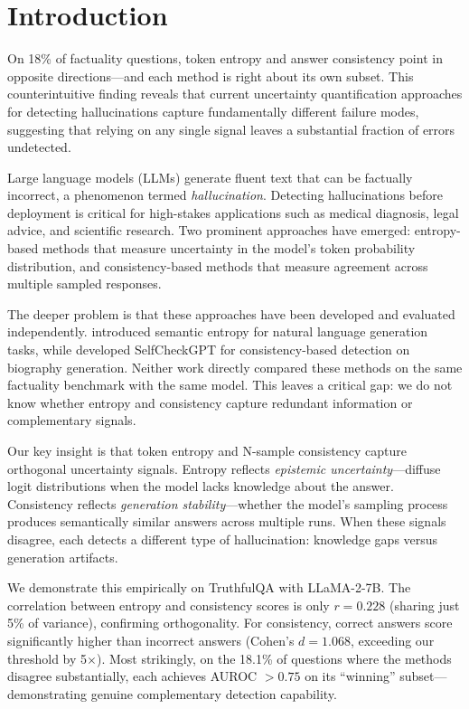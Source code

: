 \section{Introduction}

On 18\% of factuality questions, token entropy and answer consistency point in opposite directions---and each method is right about its own subset. This counterintuitive finding reveals that current uncertainty quantification approaches for detecting hallucinations capture fundamentally different failure modes, suggesting that relying on any single signal leaves a substantial fraction of errors undetected.

Large language models (LLMs) generate fluent text that can be factually incorrect, a phenomenon termed \emph{hallucination}. Detecting hallucinations before deployment is critical for high-stakes applications such as medical diagnosis, legal advice, and scientific research. Two prominent approaches have emerged: entropy-based methods that measure uncertainty in the model's token probability distribution, and consistency-based methods that measure agreement across multiple sampled responses.

The deeper problem is that these approaches have been developed and evaluated independently. \citet{kuhn2023semantic} introduced semantic entropy for natural language generation tasks, while \citet{manakul2023selfcheckgpt} developed SelfCheckGPT for consistency-based detection on biography generation. Neither work directly compared these methods on the same factuality benchmark with the same model. This leaves a critical gap: we do not know whether entropy and consistency capture redundant information or complementary signals.

Our key insight is that token entropy and N-sample consistency capture orthogonal uncertainty signals. Entropy reflects \emph{epistemic uncertainty}---diffuse logit distributions when the model lacks knowledge about the answer. Consistency reflects \emph{generation stability}---whether the model's sampling process produces semantically similar answers across multiple runs. When these signals disagree, each detects a different type of hallucination: knowledge gaps versus generation artifacts.

We demonstrate this empirically on TruthfulQA with LLaMA-2-7B. The correlation between entropy and consistency scores is only $r = 0.228$ (sharing just 5\% of variance), confirming orthogonality. For consistency, correct answers score significantly higher than incorrect answers (Cohen's $d = 1.068$, exceeding our threshold by 5$\times$). Most strikingly, on the 18.1\% of questions where the methods disagree substantially, each achieves AUROC $> 0.75$ on its ``winning'' subset---demonstrating genuine complementary detection capability.

